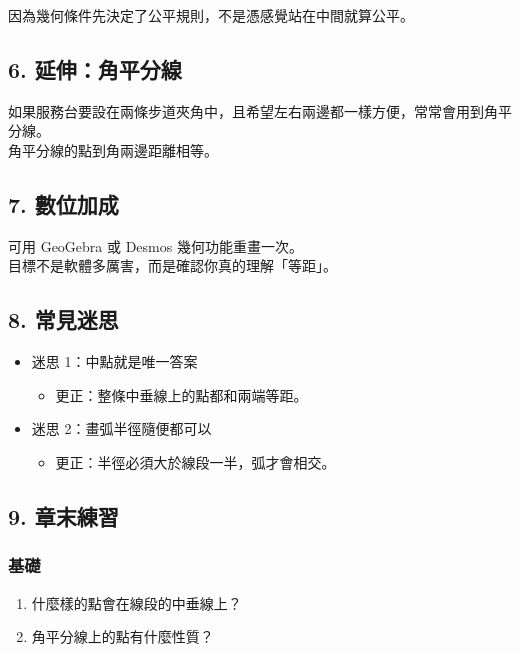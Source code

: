 \documentclass[
  chinese,
  12pt,
  a4paper,
  oneside]{article}
\providecommand{\tightlist}{%
  \setlength{\itemsep}{0pt}\setlength{\parskip}{0pt}}
\begin{document}
因為幾何條件先決定了公平規則，不是憑感覺站在中間就算公平。

\subsection{6.
延伸：角平分線}\label{ux5ef6ux4f38ux89d2ux5e73ux5206ux7dda}

如果服務台要設在兩條步道夾角中，且希望左右兩邊都一樣方便，常常會用到角平分線。\\
角平分線的點到角兩邊距離相等。

\subsection{7. 數位加成}\label{ux6578ux4f4dux52a0ux6210-2}

可用 GeoGebra 或 Desmos 幾何功能重畫一次。\\
目標不是軟體多厲害，而是確認你真的理解「等距」。

\subsection{8. 常見迷思}\label{ux5e38ux898bux8ff7ux601d-2}

\begin{itemize}
\tightlist
\item
  迷思 1：中點就是唯一答案

  \begin{itemize}
  \tightlist
  \item
    更正：整條中垂線上的點都和兩端等距。
  \end{itemize}
\item
  迷思 2：畫弧半徑隨便都可以

  \begin{itemize}
  \tightlist
  \item
    更正：半徑必須大於線段一半，弧才會相交。
  \end{itemize}
\end{itemize}

\subsection{9. 章末練習}\label{ux7ae0ux672bux7df4ux7fd2-2}

\subsubsection{基礎}\label{ux57faux790e-2}

\begin{enumerate}
\def\labelenumi{\arabic{enumi}.}
\tightlist
\item
  什麼樣的點會在線段的中垂線上？
\item
  角平分線上的點有什麼性質？
\end{enumerate}
\end{document}
